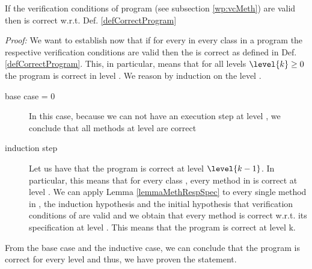 \begin{vcGenCorrect1}
 If the verification conditions  of program \Program{} (see  subsection \ref{wp:vcMeth})
are valid then \Program{} is correct w.r.t. Def. \ref{defCorrectProgram}
\end{vcGenCorrect1}
\textit{Proof:}
We want to establish now  that if for every \methodd{}
 in every class \class{} in a program \Program{}  the respective verification conditions are valid then 
the \Program{} is correct as defined in Def. \ref{defCorrectProgram}.
 This, in particular, means that for all levels $\level{k} \ge 0 $ the program is correct in  level .
We reason by induction on the level . 
\begin{description} 
\item[base case  = 0]
 In this case, because we can not have an execution step at level , we conclude that all methods at level  
are correct
\item[induction step] Let us have that the program is correct at level $\level{k-1}$. 
In particular, this means that for every class \class{}, every method \methodd{} in \class{} is correct at level .
We can apply Lemma \ref{lemmaMethRespSpec} to every single method  \methodd{} in \Program{}, 
 the induction hypothesis  and the initial hypothesis that  verification conditions  of \methodd{} are valid and we obtain that 
every method  \methodd{} is correct w.r.t. its specification at level . This means that the program is correct at level k. 
\end{description}
From the base case and the inductive case, we can conclude that the program \Program{} is correct for every level  
and thus, we have proven the statement.
 
\Qed







